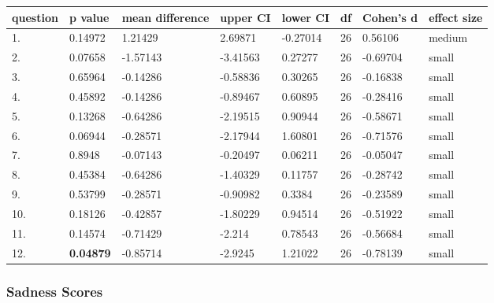 \documentclass[11pt, twoside, reqno]{book}
\begin{document}
\begin{tabular}{|l|l|l|l|l|l|l|l|}
\hline
    question & p value & mean difference & upper CI & lower CI & df & Cohen's d & effect size  \\ \hline
    1. & 0.14972 & 1.21429 & 2.69871 & -0.27014 & 26 & 0.56106 & medium \\ \hline
    2. & 0.07658 & -1.57143 & -3.41563 & 0.27277 & 26 & -0.69704 & small \\ \hline
    3. & 0.65964 & -0.14286 & -0.58836 & 0.30265 & 26 & -0.16838 & small \\ \hline
    4. & 0.45892 & -0.14286 & -0.89467 & 0.60895 & 26 & -0.28416 & small \\ \hline
    5. & 0.13268 & -0.64286 & -2.19515 & 0.90944 & 26 & -0.58671 & small \\ \hline
    6. & 0.06944 & -0.28571 & -2.17944 & 1.60801 & 26 & -0.71576 & small \\ \hline
    7. & 0.8948 & -0.07143 & -0.20497 & 0.06211 & 26 & -0.05047 & small \\ \hline
    8. & 0.45384 & -0.64286 & -1.40329 & 0.11757 & 26 & -0.28742 & small \\ \hline
    9. & 0.53799 & -0.28571 & -0.90982 & 0.3384 & 26 & -0.23589 & small \\ \hline
    10. & 0.18126 & -0.42857 & -1.80229 & 0.94514 & 26 & -0.51922 & small \\ \hline
    11. & 0.14574 & -0.71429 & -2.214 & 0.78543 & 26 & -0.56684 & small \\ \hline
    12. & \textbf{0.04879} & -0.85714 & -2.9245 & 1.21022 & 26 & -0.78139 & small \\ \hline
\end{tabular}
\vspace{16pt}

\subsubsection{\textbf{Sadness Scores}}
\end{document}
